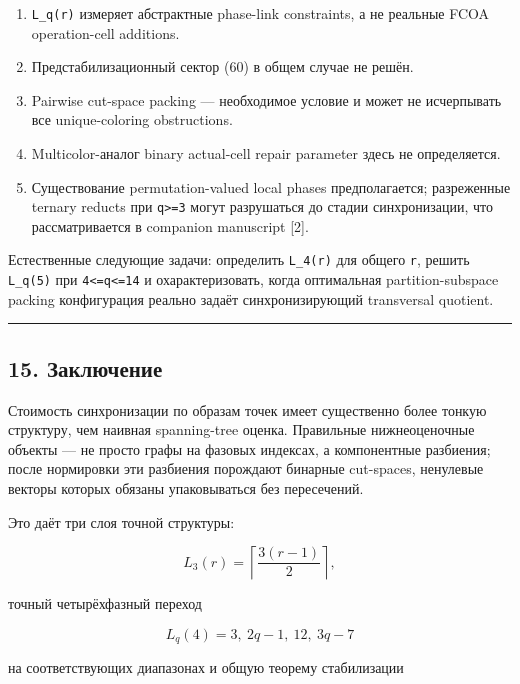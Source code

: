 \begin{enumerate}
\def\labelenumi{\arabic{enumi}.}
\tightlist
\item
  \texttt{L\_q(r)} измеряет абстрактные phase-link constraints, а не
  реальные FCOA operation-cell additions.
\item
  Предстабилизационный сектор (60) в общем случае не решён.
\item
  Pairwise cut-space packing --- необходимое условие и может не
  исчерпывать все unique-coloring obstructions.
\item
  Multicolor-аналог binary actual-cell repair parameter здесь не
  определяется.
\item
  Существование permutation-valued local phases предполагается;
  разреженные ternary reducts при \texttt{q\textgreater{}=3} могут
  разрушаться до стадии синхронизации, что рассматривается в companion
  manuscript {[}2{]}.
\end{enumerate}

Естественные следующие задачи: определить \texttt{L\_4(r)} для общего
\texttt{r}, решить \texttt{L\_q(5)} при
\texttt{4\textless{}=q\textless{}=14} и охарактеризовать, когда
оптимальная partition-subspace packing конфигурация реально задаёт
синхронизирующий transversal quotient.

\begin{center}\rule{0.5\linewidth}{0.5pt}\end{center}

\hypertarget{ux437ux430ux43aux43bux44eux447ux435ux43dux438ux435}{%
\subsection{15.
Заключение}\label{ux437ux430ux43aux43bux44eux447ux435ux43dux438ux435}}

Стоимость синхронизации по образам точек имеет существенно более тонкую
структуру, чем наивная spanning-tree оценка. Правильные нижнеоценочные
объекты --- не просто графы на фазовых индексах, а компонентные
разбиения; после нормировки эти разбиения порождают бинарные cut-spaces,
ненулевые векторы которых обязаны упаковываться без пересечений.

Это даёт три слоя точной структуры:

\[
L_3(r)=\left\lceil\frac{3(r-1)}2\right\rceil,
\]

точный четырёхфазный переход

\[
L_q(4)=3,\ 2q-1,\ 12,\ 3q-7
\]

на соответствующих диапазонах и общую теорему стабилизации

